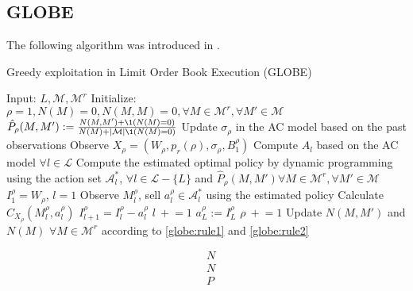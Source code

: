     \subsection{GLOBE}
        The following algorithm was introduced in \cite{Akbarzadeh2018}.
        \begin{algorithm}
            \caption[GLOBE Algorithm]{Greedy exploitation in Limit Order Book Execution (GLOBE)}
            \begin{algorithmic}
                \State Input: $L, \mathcal{M}, \mathcal{M}^r$
                \State Initialize: $\rho = 1, N(M)=0, N(M,M)=0, \forall M \in \mathcal{M}^r , \forall M' \in \mathcal{M}$
                    \State $\hat P_\rho (M, M') := \frac{N(M, M') + \1(N(M) = 0)}{N(M) + |\mathcal M| \1 (N(M) = 0)}$
                    \State Update $\sigma_\rho$ in the AC model based on the past observations
                    \State Observe $X_\rho = (W_\rho, p_r(\rho), \sigma_\rho, B_1^\rho)$
                    \State Compute $A_l$ based on the AC model $\forall l \in \mathcal{L}$
                    \State Compute the estimated optimal policy by dynamic programming using the action set $\mathcal A_l^*$, $\forall l \in \mathcal{L} - \{L\}$ and $\hat P_\rho (M, M') \forall M \in \mathcal{M}^r, \forall M' \in \mathcal M$
                    \State $I_1^\rho = W_\rho$, $l=1$
                        \State Observe $M_l^\rho$, sell $a_l^\rho\in \mathcal{A}^*_l$ using the estimated policy
                        \State Calculate $C_{X_\rho}(M_l^\rho, a_l^\rho)$
                        \State $I_{l+1}^\rho = I_l^\rho - a_l^\rho$
                        \State $l\ +\!\!=1$
                    \EndWhile
                    \State $a_{L}^\rho := I_L^\rho$
                    \State $\rho\ +\!\!= 1$
                    \State Update $N(M, M')$ and $N(M)$ $\forall M \in \mathcal{M}^r$ according to \eqref{globe:rule1} and \eqref{globe:rule2}
                \EndWhile
            \end{algorithmic}
        \end{algorithm}
        \begin{align}
            & N \label{globe:rule1}\\
            & N \nonumber\\
            & P \label{globe:rule2}
        \end{align}